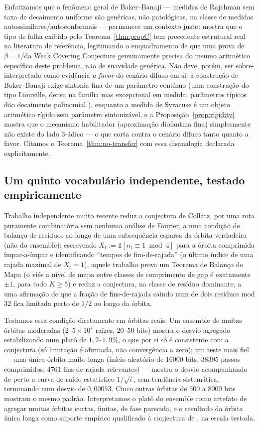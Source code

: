 \documentclass[11pt]{article}
\theoremstyle{definition}
\theoremstyle{remark}
\begin{document}
Enfatizamos que o fenômeno geral de Baker--Banaji --- medidas de
Rajchman sem taxa de decaimento uniforme são genéricas, não
patológicas, na classe de medidas autossimilares/autoconformais ---
permanece um contexto justo: mostra que o tipo de falha exibido pelo
Teorema~\ref{thm:propC} tem precedente estrutural real na literatura
de referência, legitimando o enquadramento de que uma prova de
$\beta=1$/da Weak Covering Conjecture genuinamente precisa do insumo
aritmético específico deste problema, não de suavidade genérica. Não
deve, porém, ser sobre-interpretado como evidência \emph{a favor} do
cenário difuso em si: a construção de Baker--Banaji exige sintonia
fina de um parâmetro contínuo (uma construção do tipo Liouville, densa
na família mas excepcional em medida; parâmetros típicos dão
decaimento polinomial \cite{Solomyak1995,VarjuYu2022}), enquanto a
medida de Syracuse é um objeto aritmético rígido sem parâmetro
sintonizável, e a Proposição~\ref{prop:rigidity} mostra que o
mecanismo habilitador (aproximação diofantina fina) simplesmente não
existe do lado $3$-ádico --- o que corta contra o cenário difuso tanto
quanto a favor. Citamos o Teorema~\ref{thm:no-transfer} com essa
disanalogia declarada explicitamente.

\subsection{Um quinto vocabulário independente, testado empiricamente}

Trabalho independente muito recente \cite{Chang2026} reduz a
conjectura de Collatz, por uma rota puramente combinatória sem
nenhuma análise de Fourier, a uma condição de balanço de resíduos ao
longo de uma subsequência esparsa da órbita verdadeira (não do
ensemble): escrevendo $X_t := \mathbb{1}[n_t\equiv1 \bmod 4]$ para a
órbita comprimida ímpar-a-ímpar e identificando ``tempos de
fim-de-rajada'' (o último índice de uma rajada maximal de $X_t=1$),
aquele trabalho prova um Teorema de Balanço do Mapa (o viés a nível de
mapa entre classes de comprimento de gap é exatamente $\pm1$, para
todo $K\ge5$) e reduz a conjectura, na classe de resíduo dominante, a
uma afirmação de que a fração de fins-de-rajada caindo num de dois
resíduos mod $32$ fica limitada perto de $1/2$ ao longo da órbita.

Testamos essa condição diretamente em órbitas reais. Um ensemble de
muitas órbitas moderadas ($2$--$5\times10^4$ raízes, $20$--$50$ bits)
mostra o desvio agregado estabilizando num platô de $1{,}2$--$1{,}9\%$,
o que por si só é consistente com a conjectura (só limitação é
afirmada, não convergência a zero); um teste mais fiel --- uma única
órbita muito longa (início aleatório de $16000$ bits, $38395$ passos
comprimidos, $4761$ fins-de-rajada relevantes) --- mostra o desvio
acompanhando de perto a curva de ruído estatístico $1/\sqrt{i}$, sem
tendência sistemática, terminando num desvio de $0{,}00053$. Cinco
outras órbitas de $500$ a $8000$ bits mostram o mesmo padrão.
Interpretamos o platô do ensemble como artefato de agregar muitas
órbitas curtas, finitas, de fase parecida, e o resultado da órbita
única longa como suporte empírico qualificado à conjectura de
\cite{Chang2026}, na escala testada.
\end{document}
